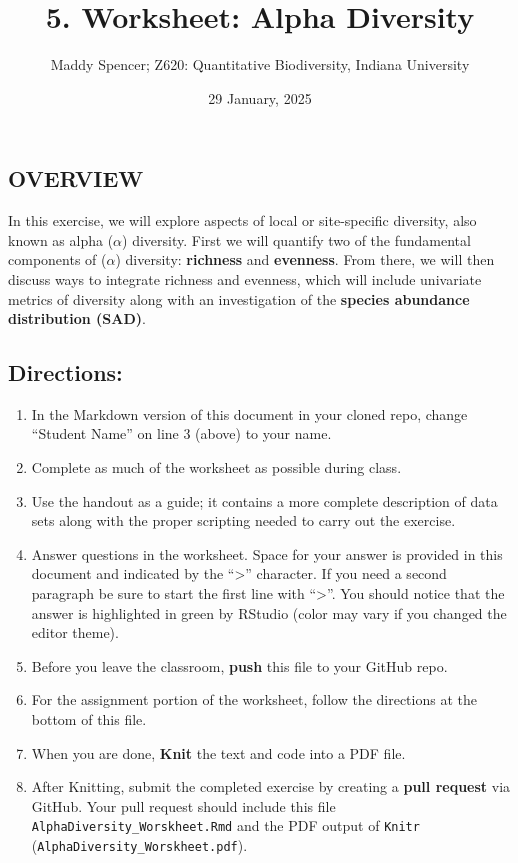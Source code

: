 \documentclass[
]{article}
\title{5. Worksheet: Alpha Diversity}
\author{Maddy Spencer; Z620: Quantitative Biodiversity, Indiana
University}
\date{29 January, 2025}
\providecommand{\tightlist}{%
  \setlength{\itemsep}{0pt}\setlength{\parskip}{0pt}}
\begin{document}
\maketitle

\subsection{OVERVIEW}\label{overview}

In this exercise, we will explore aspects of local or site-specific
diversity, also known as alpha (\(\alpha\)) diversity. First we will
quantify two of the fundamental components of (\(\alpha\)) diversity:
\textbf{richness} and \textbf{evenness}. From there, we will then
discuss ways to integrate richness and evenness, which will include
univariate metrics of diversity along with an investigation of the
\textbf{species abundance distribution (SAD)}.

\subsection{Directions:}\label{directions}

\begin{enumerate}
\def\labelenumi{\arabic{enumi}.}
\tightlist
\item
  In the Markdown version of this document in your cloned repo, change
  ``Student Name'' on line 3 (above) to your name.
\item
  Complete as much of the worksheet as possible during class.
\item
  Use the handout as a guide; it contains a more complete description of
  data sets along with the proper scripting needed to carry out the
  exercise.
\item
  Answer questions in the worksheet. Space for your answer is provided
  in this document and indicated by the ``\textgreater{}'' character. If
  you need a second paragraph be sure to start the first line with
  ``\textgreater{}''. You should notice that the answer is highlighted
  in green by RStudio (color may vary if you changed the editor theme).
\item
  Before you leave the classroom, \textbf{push} this file to your GitHub
  repo.
\item
  For the assignment portion of the worksheet, follow the directions at
  the bottom of this file.
\item
  When you are done, \textbf{Knit} the text and code into a PDF file.
\item
  After Knitting, submit the completed exercise by creating a
  \textbf{pull request} via GitHub. Your pull request should include
  this file \texttt{AlphaDiversity\_Worskheet.Rmd} and the PDF output of
  \texttt{Knitr} (\texttt{AlphaDiversity\_Worskheet.pdf}).
\end{enumerate}
\end{document}
